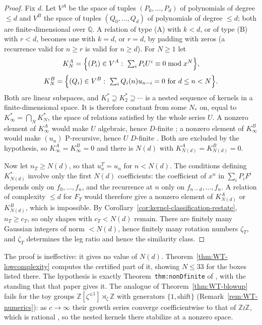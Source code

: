\documentclass[11pt]{article}
\theoremstyle{plain}
\theoremstyle{definition}
\theoremstyle{remark}
\newcommand{\Z}{\mathbb{Z}}
\newcommand{\Q}{\mathbb{Q}}
\begin{document}
\begin{proof}
Fix $d$. Let $V^{A}$ be the space of tuples $(P_0,\dots,P_d)$ of polynomials of
degree $\le d$ and $V^{B}$ the space of tuples $(Q_0,\dots,Q_d)$ of polynomials
of degree $\le d$; both are finite-dimensional over $\Q$. A relation of type
(A) with $k<d$, or of type (B) with $r<d$, becomes one with $k=d$, or $r=d$,
by padding with zeros (a recurrence valid for $n\ge r$ is valid for $n\ge d$).
For $N\ge1$ let
\[
  K_N^{A}=\Bigl\{(P_i)\in V^{A}:\ \textstyle\sum_iP_iU^i\equiv0\bmod x^N\Bigr\},
\]
\[
  K_N^{B}=\Bigl\{(Q_i)\in V^{B}:\ \textstyle\sum_iQ_i(n)u_{n-i}=0\ \text{for } d\le n<N\Bigr\}.
\]
Both are linear subspaces, and $K_1^\ast\supseteq K_2^\ast\supseteq\cdots$ is a
nested sequence of kernels in a finite-dimensional space. It is therefore
constant from some $N_\ast$ on, equal to $K_\infty^\ast=\bigcap_NK_N^\ast$, the
space of relations satisfied by the whole series $U$. A nonzero element of
$K_\infty^{A}$ would make $U$ algebraic, hence $D$-finite
\cite[Thm.~6.4.6]{Stanley1999}; a nonzero element of $K_\infty^{B}$ would make
$(u_n)$ P-recursive, hence $U$ $D$-finite \cite[\S6.4]{Stanley1999}. Both are
excluded by the hypothesis, so $K_\infty^{A}=K_\infty^{B}=0$ and there is $N(d)$
with $K_{N(d)}^{A}=K_{N(d)}^{B}=0$.

Now let $n_T\ge N(d)$, so that $u_n^T=u_n$ for $n<N(d)$. The conditions defining
$K_{N(d)}^\ast$ involve only the first $N(d)$ coefficients: the coefficient of
$x^n$ in $\sum_iP_iF^i$ depends only on $f_0,\dots,f_n$, and the recurrence at
$n$ only on $f_{n-d},\dots,f_n$. A relation of complexity $\le d$ for $F_T$ would
therefore give a nonzero element of $K_{N(d)}^{A}$ or $K_{N(d)}^{B}$, which is
impossible. By Corollary~\ref{cor:kernel-classification-restate}, $n_T\ge c_T$,
so only shapes with $c_T<N(d)$ remain. There are finitely many Gaussian
integers of norm $<N(d)$, hence finitely many rotation numbers $\zeta_T$, and
$\zeta_T$ determines the leg ratio and hence the similarity class.
\end{proof}

The proof is ineffective: it gives no value of $N(d)$.
Theorem~\ref{thm:WT-lowcomplexity} computes the certified part of it, showing
$N\le33$ for the boxes listed there. The hypothesis is exactly
Theorem~\texttt{thm:nonDfinite} of \cite{Bonfioli2026b}, with the standing that
that paper gives it. The analogue of Theorem~\ref{thm:WT-blowup} fails for the
toy groups $\Z[\zeta^{\pm1}]\rtimes_\zeta\Z$ with generators $\{1,\text{shift}\}$
(Remark~\ref{rem:WT-numerics}): as $c\to\infty$ their growth series converge
coefficientwise to that of $\Z\wr\Z$, which is rational \cite{Parry1992}, so the
nested kernels there stabilize at a nonzero space.
\end{document}
